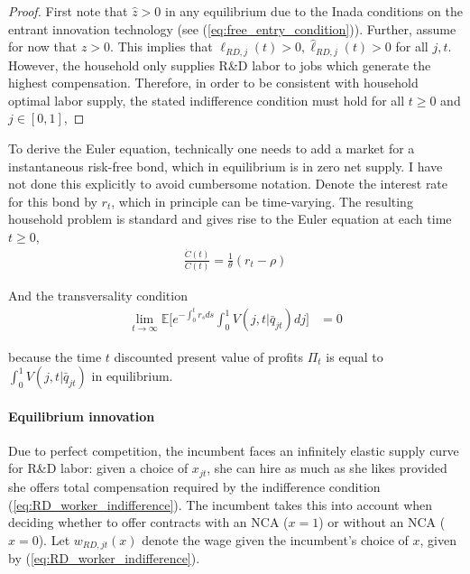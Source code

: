 \documentclass[11pt,english]{article}
\begin{document}
\begin{proof}
	First note that $\hat{z} > 0$ in any equilibrium due to the Inada conditions on the entrant innovation technology (see (\ref{eq:free_entry_condition})). Further, assume for now that $z > 0$. This implies that $\ell_{RD,j}(t) > 0, \hat{\ell}_{RD,j}(t) > 0$ for all $j,t$. However, the household only supplies R\&D labor to jobs which generate the highest compensation. Therefore, in order to be consistent with household optimal labor supply, the stated indifference condition must hold for all $t \ge 0$ and $j \in [0,1]$, 
\end{proof}



To derive the Euler equation, technically one needs to add a market for a instantaneous risk-free bond, which in equilibrium is in zero net supply. I have not done this explicitly to avoid cumbersome notation. Denote the interest rate for this bond by $r_t$, which in principle can be time-varying. The resulting household problem is standard and gives rise to the Euler equation at each time $t \ge 0$, 
\begin{align}
\frac{\dot{C}(t)}{C(t)} = \frac{1}{\theta} (r_t - \rho) \label{eq:euler0} 
\end{align}

And the transversality condition
\begin{align}
	\lim_{t \to \infty} \mathbb{E} \Big[ e^{-\int_0^t r_s ds} \int_0^1 V(j,t|\bar{q}_{jt}) dj \Big] &= 0 \label{eq:tvc0}
\end{align}

because the time $t$ discounted present value of profits $\Pi_t$ is equal to $\int_0^1 V(j,t | \bar{q}_{jt})$ in equilibrium.

\paragraph{Equilibrium innovation}

Due to perfect competition, the incumbent faces an infinitely elastic supply curve for R\&D labor: given a choice of $x_{jt}$, she can hire as much as she likes provided she offers total compensation required by the indifference condition (\ref{eq:RD_worker_indifference}). The incumbent takes this into account when deciding whether to offer contracts with an NCA ($x = 1$) or without an NCA ($x = 0$). Let $w_{RD,jt}(x)$ denote the  wage given the incumbent's choice of $x$, given by (\ref{eq:RD_worker_indifference}).
\end{document}
